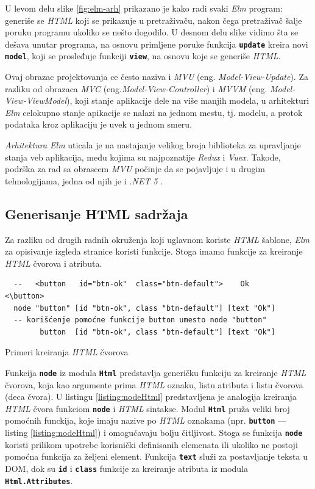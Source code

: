 \documentclass[12pt,oneside]{memoir}
\begin{document}
U levom delu slike \ref{fig:elm-arh} prikazano je kako radi svaki \emph{Elm} program: generiše
se \emph{HTML} koji se prikazuje u pretraživaču, nakon čega pretraživač šalje poruku programu
ukoliko se nešto dogodilo. U desnom delu slike vidimo šta se dešava unutar programa,
na osnovu primljene poruke funkcija \texttt{\textbf{update}} kreira novi\texttt{
\textbf{model}}, koji se prosleđuje funkciji \texttt{\textbf{view}}, na osnovu koje
se generiše \emph{HTML}.

Ovaj obrazac projektovanja ce često naziva i \emph{MVU} (eng. \emph{Model-View-Update}). Za 
razliku od obrazaca \emph{MVC} \cite{jsPatterns} (eng.\emph{Model-View-Controller}) i \emph{MVVM} \cite{jsPatterns}
(eng. \emph{Model-View-ViewModel}), koji stanje aplikacije dele na više manjih modela,
u arhitekturi \emph{Elm} celokupno stanje apikacije se nalazi na jednom mestu, tj. modelu, a
protok podataka kroz aplikaciju je uvek u jednom smeru. 

\emph{Arhitektura Elm} uticala je na nastajanje velikog broja biblioteka za upravljanje
stanja veb aplikacija, među kojima su najpoznatije \emph{Redux}\cite{redux} i \emph{Vuex}\cite{vuex}.
Takođe, podrška za rad sa obrascem \emph{MVU} počinje da se pojavljuje i u drugim tehnologijama,
jedna od njih je i \emph{.NET 5} \cite{net5}.

\subsection{Generisanje HTML sadržaja}
Za razliku od drugih radnih okruženja koji uglavnom koriste \emph{HTML} šablone, \emph{Elm} za 
opisivanje izgleda stranice koristi funkcije. Stoga imamo funkcije za kreiranje \emph{HTML}
čvorova i atributa.
\begin{listing}[h]
  \begin{verbatim}
  --   <button   id="btn-ok"  class="btn-default">    Ok      <\button>
  node "button" [id "btn-ok", class "btn-default"] [text "Ok"]
  -- korišćenje pomoćne funkcije button umesto node "button"
        button  [id "btn-ok", class "btn-default"] [text "Ok"]
  \end{verbatim}
  \caption{Primeri kreiranja \emph{HTML} čvorova}
  \label{listing:nodeHtml}
  \end{listing}
  
Funkcija \texttt{\textbf{node}} iz modula \texttt{\textbf{Html}} predstavlja generičku
funkciju za kreiranje \emph{HTML} čvorova, koja kao argumente prima \emph{HTML} oznaku, listu atributa
i listu čvorova (deca čvora). U listingu \ref{listing:nodeHtml} predstavljena je analogija
kreiranja \emph{HTML} čvora funkciom \texttt{\textbf{node}} i \emph{HTML} sintakse.
Modul \texttt{\textbf{Html}} pruža veliki broj pomoćnih funckija, koje imaju nazive po
\emph{HTML} oznakama (npr. \texttt{\textbf{button}} --- listing \ref{listing:nodeHtml}) i omogućavaju bolju čitljivost. Stoga se 
funkcija \texttt{\textbf{node}} koristi prilikom upotrebe korisnički definisanih elemenata
ili ukoliko ne postoji pomoćna funkcija za željeni element. Funkcija \texttt{\textbf{text}}
služi za postavljanje teksta u DOM, dok su \texttt{\textbf{id}} i \texttt{\textbf{class}}
funkcije za kreiranje atributa iz modula \texttt{\textbf{Html.Attributes}}.
\end{document}
